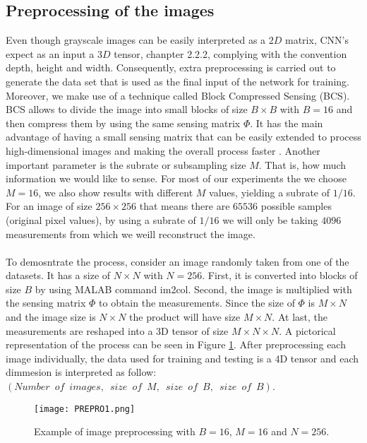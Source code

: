 \subsection{Preprocessing of the images}
Even though grayscale images can be easily interpreted as a $2D$ matrix, CNN's expect as an input a $3D$ tensor, chanpter 2.2.2, complying with the convention depth, height and width. Consequently, extra preprocessing is carried out to generate the data set that is used as the final input of the network for training. Moreover, we make use of a technique called Block Compressed Sensing (BCS). BCS allows to divide the image into small blocks of size $B \times B$ with $B=16$ and then compress them by using the same sensing matrix $\Phi$. It has the main advantage of having a small sensing matrix that can be easily extended to process high-dimensional images and making the overall process faster \cite{gan2007block, fowler2012block}. Another important parameter is the subrate or subsampling size $M$. That is, how much information we would like to sense. For most of our experiments the we choose $M=16$, we also show results with different $M$ values, yielding a subrate of $1/16$. For an image of size $256 \times 256$ that means there are $65536$ possible samples (original pixel values), by using a subrate of $1/16$ we will only be taking $4096$ measurements from which we weill reconstruct the image.          \
\\\\
To demosntrate the process, consider an image randomly taken from one of the datasets. It has a size of $N \times N$ with $N=256$. First, it is converted into  blocks of size $B$ by using MALAB command im2col. Second, the image is multiplied with the sensing matrix $\Phi$ to obtain the measurements. Since the size of $\Phi$ is $M \times N $ and the image size is $N \times N$ the product will have size $M \times N$. At last, the measurements are reshaped into a 3D tensor of size $M \times N \times N$. A pictorical representation of the process can be seen in Figure \ref{fig:PREPROim1}. After preprocessing each image individually, the data used for training and testing is a 4D tensor and each dimmesion is interpreted as follow: $(Number \enspace of \enspace images, \enspace size \enspace of \enspace M ,\enspace size \enspace of \enspace B , \enspace size \enspace of \enspace B)$.  
\begin{figure}[tb] 
\centering 
\texttt{[image: PREPRO1.png]} 
\caption[Preprocessing of images]{Example of image preprocessing  with $B=16$, $M=16$ and $N=256$.}
\label{fig:PREPROim1} 
\end{figure}

